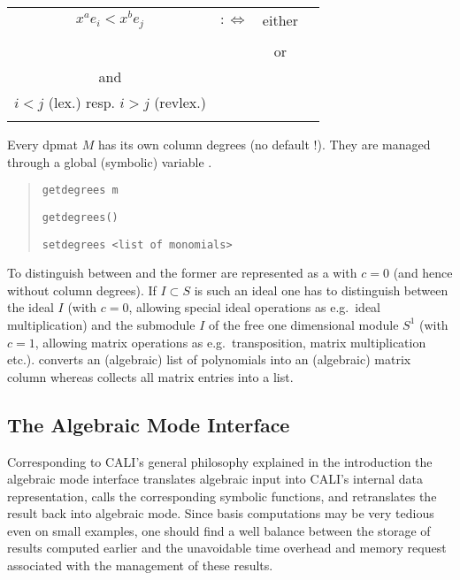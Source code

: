 \begin{tabular}{cccp{6cm}}
$x^ae_i<x^be_j$ & $:\Leftrightarrow$ & either &
{\centering $x^ax^{a_i}<x^bx^{a_j}$ in $S$\\}\\
& & or &
{\centering $x^ax^{a_i}=x^bx^{a_j}$ \\ and \\
$i<j$ (lex.) resp. $i>j$ (revlex.)\\}
\end{tabular}

Every dpmat $M$ has its own column degrees (no default !).  They are
managed through a global (symbolic) variable .
\begin{quote}
\verb|getdegrees m| 


\verb|getdegrees()|


\verb|setdegrees <list of monomials>| 

\end{quote}

To distinguish between  and  the former are
represented as a  with $c=0$ (and hence without column
degrees).  If $I \subset S$ is such an ideal one has to distinguish
between the ideal $I$ (with $c=0$, allowing special ideal operations
as e.g.\ ideal multiplication) and the submodule $I$ of the free
one dimensional module $S^1$ (with $c=1$, allowing matrix operations
as e.g.\  transposition, matrix multiplication etc.). 
converts an (algebraic) list of polynomials into an (algebraic)
matrix column whereas  collects all matrix entries into
a list.

\subsection{The Algebraic Mode Interface}

Corresponding to CALI's general philosophy explained in the
introduction the algebraic mode interface translates algebraic input
into CALI's internal data representation, calls the corresponding
symbolic functions, and retranslates the result back into algebraic
mode. Since \gr basis computations may be very tedious even on small
examples, one should find a well balance between the storage of
results computed earlier and the unavoidable time overhead and memory
request associated with the management of these results.

